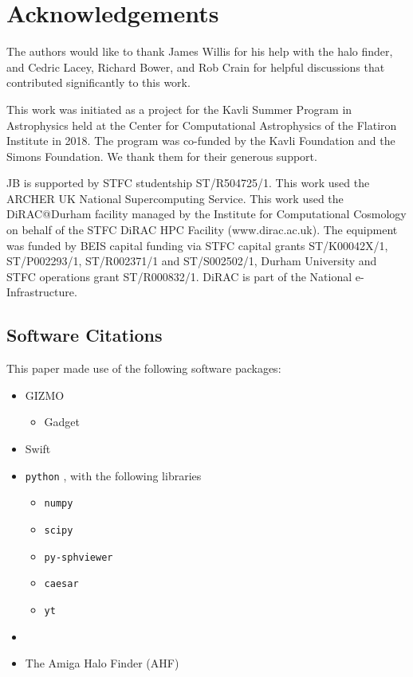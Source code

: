 \section{Acknowledgements}
\label{sec:acknowledgements}

The authors would like to thank James Willis for his help with the
\velociraptor{} halo finder, and Cedric Lacey, Richard Bower, and Rob Crain for
helpful discussions that contributed significantly to this work.

This work was initiated as a project for the Kavli Summer Program in
Astrophysics held at the Center for Computational Astrophysics of the
Flatiron Institute in 2018. The program was co-funded by the Kavli Foundation
and the Simons Foundation. We thank them for their generous support.

JB is supported by STFC studentship ST/R504725/1. This work used the ARCHER
UK National Supercomputing Service.
This work used the DiRAC@Durham facility managed by the Institute for
Computational Cosmology on behalf of the STFC DiRAC HPC Facility
(www.dirac.ac.uk). The equipment was funded by BEIS capital funding
via STFC capital grants ST/K00042X/1, ST/P002293/1, ST/R002371/1 and
ST/S002502/1, Durham University and STFC operations grant
ST/R000832/1. DiRAC is part of the National e-Infrastructure.

\subsection{Software Citations}

This paper made use of the following software packages:
\begin{itemize}
    \item GIZMO \citep{Hopkins2017}
        \begin{itemize}
            \item Gadget \citep{Springel2005b}
        \end{itemize}
    \item {\sc Swift} \citep{Schaller2016}
    \item {\tt python} \citep{Rossum1995}, with the following libraries
    \begin{itemize}
    	\item {\tt numpy} \citep{Numpy2006}
    	\item {\tt scipy} \citep{Scipy2001}
    	\item {\tt py-sphviewer} \citep{Benitez-Llambay2015}
    	\item {\tt caesar} \citep{Thompson2018}
    	\item {\tt yt} \citep{Turk2011}
    \end{itemize}
    \item \velociraptor{} \citep{Elahi2019}
    \item The Amiga Halo Finder (AHF) \citep{Gill2004, Knollmann2009}
\end{itemize}


